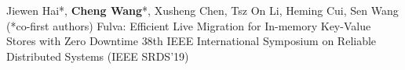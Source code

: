 \cvpub
{Jiewen Hai*, \textbf{Cheng Wang}*, Xusheng Chen, Tsz On Li, Heming Cui, Sen Wang (*co-first authors)} %
{Fulva: Efficient Live Migration for In-memory Key-Value Stores with Zero Downtime} %
{} %
{} %
{ %
38th IEEE International Symposium on Reliable Distributed Systems (IEEE SRDS'19)\newline
}
